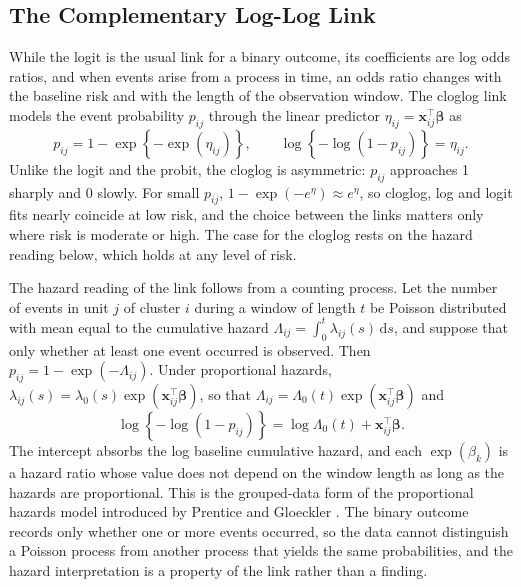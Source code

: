 \subsection{The Complementary Log-Log Link}
\label{sec:tech-cloglog}

While the logit is the usual link for a binary outcome, its coefficients are log odds ratios, and when events arise from a process in time, an odds ratio changes with the baseline risk and with the length of the observation window.
The cloglog link models the event probability $p_{ij}$ through the linear predictor $\eta_{ij} = \mathbf{x}_{ij}^\top \boldsymbol{\beta}$ as
\begin{equation}
  p_{ij} = 1 - \exp\!\left\{-\exp(\eta_{ij})\right\},
  \qquad
  \log\!\left\{-\log(1 - p_{ij})\right\} = \eta_{ij} .
  \label{eq:tech-cloglog}
\end{equation}
Unlike the logit and the probit, the cloglog is asymmetric: $p_{ij}$ approaches 1 sharply and 0 slowly.
For small $p_{ij}$, $1 - \exp(-e^{\eta}) \approx e^{\eta}$, so cloglog, log and logit fits nearly coincide at low risk, and the choice between the links matters only where risk is moderate or high.
The case for the cloglog rests on the hazard reading below, which holds at any level of risk.

The hazard reading of the link follows from a counting process.
Let the number of events in unit $j$ of cluster $i$ during a window of length $t$ be Poisson distributed with mean equal to the cumulative hazard $\Lambda_{ij} = \int_0^t \lambda_{ij}(s)\,\mathrm{d}s$, and suppose that only whether at least one event occurred is observed.
Then $p_{ij} = 1 - \exp(-\Lambda_{ij})$.
Under proportional hazards, $\lambda_{ij}(s) = \lambda_0(s) \exp(\mathbf{x}_{ij}^\top \boldsymbol{\beta})$, so that $\Lambda_{ij} = \Lambda_0(t) \exp(\mathbf{x}_{ij}^\top \boldsymbol{\beta})$ and
\begin{equation}
  \log\!\left\{-\log(1 - p_{ij})\right\} = \log \Lambda_0(t) + \mathbf{x}_{ij}^\top \boldsymbol{\beta} .
  \label{eq:tech-cloglog-ph}
\end{equation}
The intercept absorbs the log baseline cumulative hazard, and each $\exp(\beta_k)$ is a hazard ratio whose value does not depend on the window length as long as the hazards are proportional.
This is the grouped-data form of the proportional hazards model introduced by Prentice and Gloeckler \cite{prentice1978grouped}.
The binary outcome records only whether one or more events occurred, so the data cannot distinguish a Poisson process from another process that yields the same probabilities, and the hazard interpretation is a property of the link rather than a finding.

